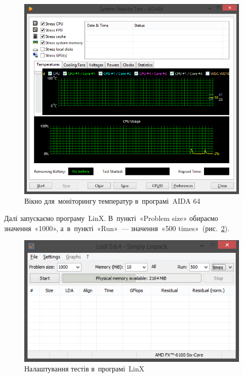 \documentclass[
	a4paper,
	oneside,
	BCOR = 10mm,
	DIV = 12,
	12pt,
	headings = normal,
]{scrartcl}
\begin{document}
			\begin{figure}[!htbp]
				\centering
				\includegraphics[height = 10\baselineskip]{./assets/y03s02-pcdiag-lab-03-p01-aida64.png}
				\caption{Вікно для~моніторингу температур в~програмі~\textenglish{AIDA 64}}
				\label{fig:aida64}
			\end{figure}

			Далі запускаємо програму~\textenglish{LinX}. В~пункті~«\textenglish{Problem size}» обираємо значення~«1000», а~в~пункті~«\textenglish{Run}»~— значення~«\textenglish{500 times}»~(рис.~\ref{fig:linx-settings}). 

			\begin{figure}[!htbp]
				\centering
				\includegraphics[height = 7\baselineskip]{./assets/y03s02-pcdiag-lab-03-p02-linx-settings.png}
				\caption{Налаштування тестів в~програмі~\textenglish{LinX}}
				\label{fig:linx-settings}
			\end{figure}
				
\end{document}
